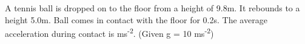 \item A tennis ball is dropped on to the floor from a height of 9.8m. It rebounds to a height 5.0m. Ball comes in contact with the floor for 0.2s. The average acceleration during contact is \underline{\hspace{2.5cm}} ms\textsuperscript{-2}. (Given g = 10 ms\textsuperscript{-2})